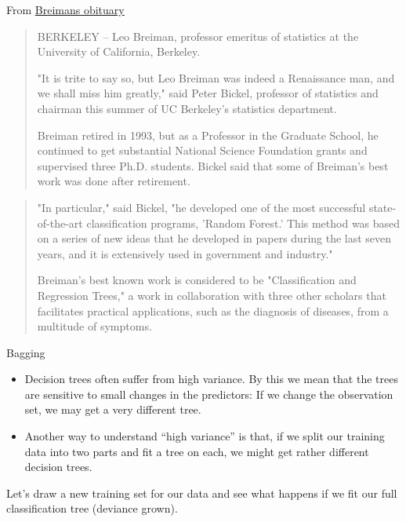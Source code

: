 \documentclass[10pt,ignorenonframetext,]{beamer}
\begin{document}
\begin{frame}

From
\href{https://www.berkeley.edu/news/media/releases/2005/07/07_breiman.shtml}{Breimans
obituary} \vspace{1mm}

\begin{quote}
BERKELEY – Leo Breiman, professor emeritus of statistics at the University of California, Berkeley.

"It is trite to say so, but Leo Breiman was indeed a Renaissance man, and we shall miss him greatly," said Peter Bickel, professor of statistics and chairman this summer of UC Berkeley's statistics department.

Breiman retired in 1993, but as a Professor in the Graduate School, he continued to get substantial National Science Foundation grants and supervised three Ph.D. students. Bickel said that some of Breiman's best work was done after retirement.

\end{quote}

\end{frame}

\begin{frame}

\begin{quote}
"In particular," said Bickel, "he developed one of the most successful state-of-the-art classification programs, 'Random Forest.' This method was based on a series of new ideas that he developed in papers during the last seven years, and it is extensively used in government and industry."

Breiman's best known work is considered to be "Classification and Regression Trees," a work in collaboration with three other scholars that facilitates practical applications, such as the diagnosis of diseases, from a multitude of symptoms.

\end{quote}

\end{frame}

\begin{frame}{Bagging}

\vspace{2mm}

\begin{itemize}
\item
  Decision trees often suffer from high variance. By this we mean that
  the trees are sensitive to small changes in the predictors: If we
  change the observation set, we may get a very different tree.
\item
  Another way to understand ``high variance'' is that, if we split our
  training data into two parts and fit a tree on each, we might get
  rather different decision trees.
\end{itemize}

\vspace{2mm}

Let's draw a new training set for our data and see what happens if we
fit our full classification tree (deviance grown).

\end{frame}
\end{document}
